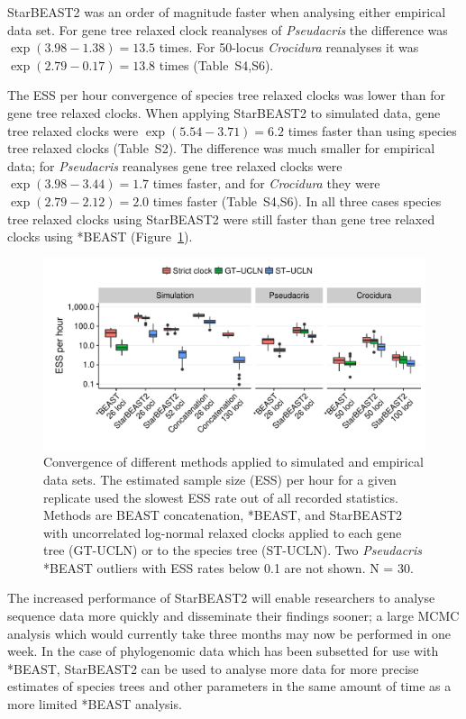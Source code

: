 \documentclass[nogrid]{MBE}%
\begin{document}
StarBEAST2 was an order of magnitude faster when analysing either
empirical data set. For gene tree relaxed clock reanalyses of
\textit{Pseudacris} the difference was $\exp(3.98 - 1.38) = 13.5$ times. For
50-locus \textit{Crocidura} reanalyses it was $\exp(2.79 - 0.17) = 13.8$ times
(Table~S4,S6).

The ESS per hour convergence of species tree relaxed clocks was lower than for
gene tree relaxed clocks. When applying StarBEAST2 to simulated data, gene tree relaxed clocks were
$\exp(5.54 - 3.71) = 6.2$ times faster than using species tree relaxed clocks (Table~S2). The difference was much smaller for empirical data;
for \textit{Pseudacris} reanalyses gene tree relaxed clocks were $\exp(3.98 -
3.44) = 1.7$ times faster, and for \textit{Crocidura} they were $\exp(2.79 -
2.12) = 2.0$ times faster (Table~S4,S6). In all three cases species tree relaxed clocks
using StarBEAST2 were still faster than gene tree relaxed clocks using *BEAST
(Figure~\ref{fig:essPerHourComparison}).

\begin{figure}[htb!]
\centering
\includegraphics[width=130mm]{minimum-ess_per_hour-comparison.pdf}
\caption
{Convergence of different methods applied to simulated and empirical data
sets. The estimated sample size (ESS) per hour for a given replicate used the
slowest ESS rate out of all recorded statistics. Methods are BEAST
concatenation, *BEAST, and StarBEAST2 with uncorrelated log-normal relaxed
clocks applied to each gene tree (GT-UCLN) or to the species tree (ST-UCLN).
Two \textit{Pseudacris} *BEAST outliers with ESS rates below 0.1
are not shown.  N = 30.}
\label{fig:essPerHourComparison}
\end{figure}

The increased performance of StarBEAST2 will enable researchers to analyse
sequence data more quickly and disseminate their findings sooner; a large MCMC
analysis which would currently take three months may now be performed in one
week. In the case of phylogenomic data which has been subsetted for use with
*BEAST, StarBEAST2 can be used to analyse more data for more
precise estimates of species trees and other parameters in the same amount of
time as a more limited *BEAST analysis.
\end{document}
